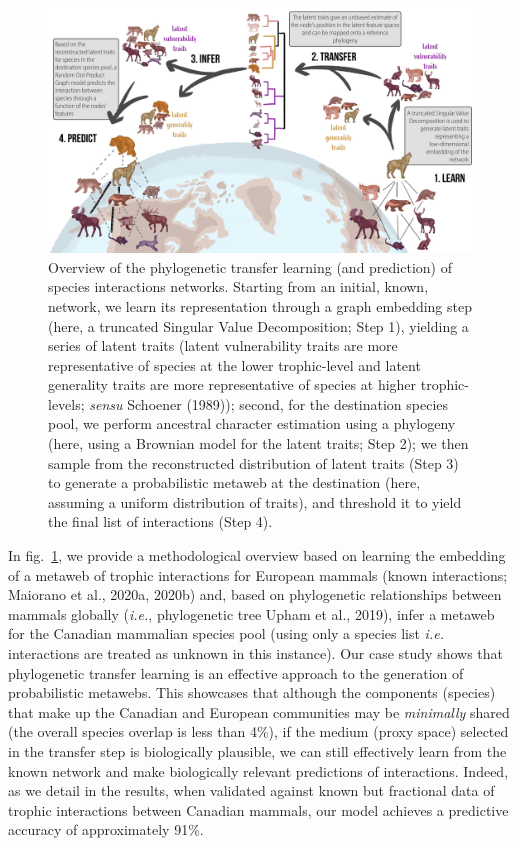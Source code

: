 \documentclass[10pt,oneside]{article}
\makeatletter
\def\maxwidth{\ifdim\Gin@nat@width>\linewidth\linewidth
\else\Gin@nat@width\fi}
\let\Oldincludegraphics\includegraphics
\renewcommand{\includegraphics}[1]{\Oldincludegraphics[width=\maxwidth]{#1}}
\makeatother
\begin{document}
\begin{figure}
\hypertarget{fig:concept}{%
\centering
\includegraphics{figures/figure-concept_v2.png}
\caption{Overview of the phylogenetic transfer learning (and prediction)
of species interactions networks. Starting from an initial, known,
network, we learn its representation through a graph embedding step
(here, a truncated Singular Value Decomposition; Step 1), yielding a
series of latent traits (latent vulnerability traits are more
representative of species at the lower trophic-level and latent
generality traits are more representative of species at higher
trophic-levels; \emph{sensu} Schoener (1989)); second, for the
destination species pool, we perform ancestral character estimation
using a phylogeny (here, using a Brownian model for the latent traits;
Step 2); we then sample from the reconstructed distribution of latent
traits (Step 3) to generate a probabilistic metaweb at the destination
(here, assuming a uniform distribution of traits), and threshold it to
yield the final list of interactions (Step 4).}\label{fig:concept}
}
\end{figure}

In fig.~\ref{fig:concept}, we provide a methodological overview based on
learning the embedding of a metaweb of trophic interactions for European
mammals (known interactions; Maiorano et al., 2020a, 2020b) and, based
on phylogenetic relationships between mammals globally (\emph{i.e.},
phylogenetic tree Upham et al., 2019), infer a metaweb for the Canadian
mammalian species pool (using only a species list \emph{i.e.}
interactions are treated as unknown in this instance). Our case study
shows that phylogenetic transfer learning is an effective approach to
the generation of probabilistic metawebs. This showcases that although
the components (species) that make up the Canadian and European
communities may be \emph{minimally} shared (the overall species overlap
is less than 4\%), if the medium (proxy space) selected in the transfer
step is biologically plausible, we can still effectively learn from the
known network and make biologically relevant predictions of
interactions. Indeed, as we detail in the results, when validated
against known but fractional data of trophic interactions between
Canadian mammals, our model achieves a predictive accuracy of
approximately 91\%.
\end{document}
